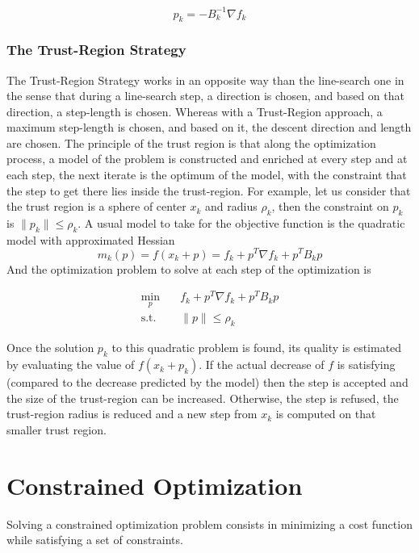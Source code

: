 \begin{equation}
  p_k = -B_k^{-1}\nabla f_k
\end{equation}

\subsubsection{The Trust-Region Strategy}
\label{ssec:the_trust_region_strategy}
The Trust-Region Strategy works in an opposite way than the line-search one in
the sense that during a line-search step, a direction is chosen, and based on
that direction, a step-length is chosen. Whereas with a Trust-Region approach, a
maximum step-length is chosen, and based on it, the descent direction and length
are chosen.
The principle of the trust region is that along the optimization process, a
model of the problem is constructed and enriched at every step and at each step,
the next iterate is the optimum of the model, with the constraint that the step
to get there lies inside the trust-region. For example, let us consider that
the trust region is a sphere of center $x_k$ and radius $\rho_k$, then the
constraint on $p_k$ is $\|p_k\| \leq \rho_k$. A usual model to take for the
objective function is the quadratic model with approximated Hessian
\begin{equation}
  m_k(p) = f(x_k+p) = f_k + p^T \nabla f_k + p^T B_k p
\end{equation}
And the optimization problem to solve at each step of the optimization is

\begin{align}
  \min_{p} & \quad f_k + p^T \nabla f_k + p^T B_k p \nonumber\\
\text{s.t.}&
\quad \|p\| \leq \rho_k
\label{eq:trustRegionNLP}
\end{align}

Once the solution $p_k$ to this quadratic problem is found, its quality is
estimated by evaluating the value of $f(x_k+p_k)$. If the actual decrease of $f$
is satisfying (compared to the decrease predicted by the model) then the step is
accepted and the size of the trust-region can be increased. Otherwise, the step
is refused, the trust-region radius is reduced and a new step from $x_k$ is
computed on that smaller trust region.

\section{Constrained Optimization}

Solving a constrained optimization problem consists in minimizing a cost function while satisfying a set of constraints.

